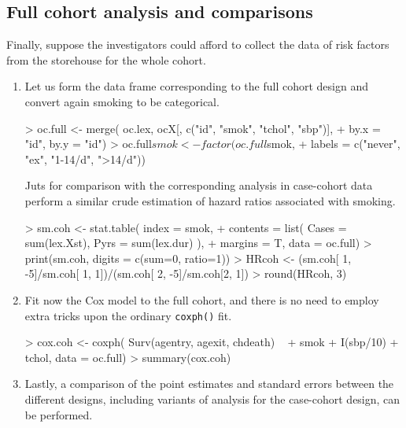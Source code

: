 \subsection{Full cohort analysis and comparisons}

Finally, suppose the investigators could afford to collect the
data of risk factors from the storehouse for the whole cohort.

\begin{enumerate}[resume]
\item
Let us form the data frame corresponding to the full cohort design
and convert again smoking to be categorical.
\begin{Schunk}
\begin{Sinput}
> oc.full <- merge( oc.lex, ocX[, c("id", "smok", "tchol", "sbp")], 
+    by.x = "id", by.y = "id") 
> oc.full$smok <- factor(oc.full$smok, 
+     labels = c("never", "ex", "1-14/d", ">14/d"))
\end{Sinput}
\end{Schunk}

Juts for comparison with the corresponding analysis in case-cohort data
perform a similar crude estimation of hazard ratios associated with smoking.
\begin{Schunk}
\begin{Sinput}
> sm.coh <- stat.table( index = smok, 
+    contents = list( Cases = sum(lex.Xst), Pyrs = sum(lex.dur) ),
+ 	 margins = T, data = oc.full)
> print(sm.coh, digits = c(sum=0, ratio=1))
> HRcoh <- (sm.coh[ 1, -5]/sm.coh[ 1, 1])/(sm.coh[ 2, -5]/sm.coh[2, 1])		
> round(HRcoh, 3)			
\end{Sinput}
\end{Schunk}


\item
Fit now the Cox model to the full cohort, and there is no need
to employ extra tricks upon the ordinary {\tt coxph()} fit.

\begin{Schunk}
\begin{Sinput}
> cox.coh <- coxph( Surv(agentry, agexit, chdeath) ~ 
+         smok + I(sbp/10)  + tchol, data = oc.full)
> summary(cox.coh)        
\end{Sinput}
\end{Schunk}

\item
Lastly, a comparison of the point estimates and standard errors between 
the different designs, including variants of analysis for the case-cohort design, can be performed.


\end{enumerate}
